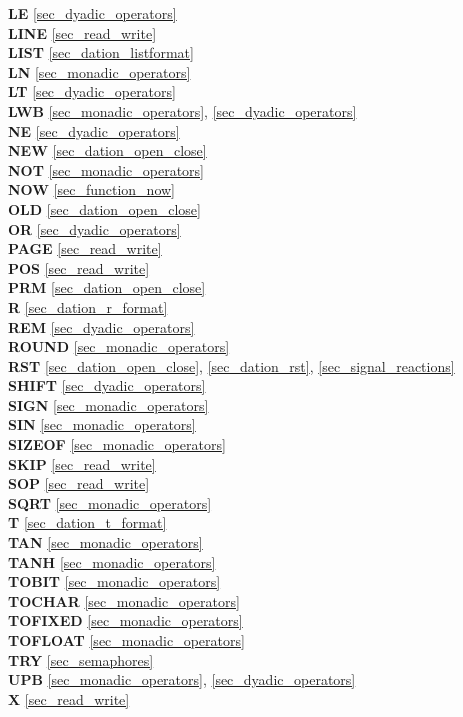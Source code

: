 { 
{\bf LE} \ref{sec_dyadic_operators}\\
{\bf LINE} \ref{sec_read_write}\\
{\bf LIST} \ref{sec_dation_listformat}\\
{\bf LN} \ref{sec_monadic_operators}\\
{\bf LT} \ref{sec_dyadic_operators}\\
{\bf LWB} \ref{sec_monadic_operators}, \ref{sec_dyadic_operators}\\
 
{\bf NE} \ref{sec_dyadic_operators}\\
{\bf NEW} \ref{sec_dation_open_close}\\
{\bf NOT} \ref{sec_monadic_operators}\\
{\bf NOW} \ref{sec_function_now}\\
 
{\bf OLD} \ref{sec_dation_open_close}\\
{\bf OR} \ref{sec_dyadic_operators}\\
 
{\bf PAGE} \ref{sec_read_write}\\
{\bf POS} \ref{sec_read_write}\\
{\bf PRM} \ref{sec_dation_open_close}\\
 
{\bf R} \ref{sec_dation_r_format}\\
{\bf REM} \ref{sec_dyadic_operators}\\
{\bf ROUND} \ref{sec_monadic_operators}\\
{\bf RST} \ref{sec_dation_open_close}, \ref{sec_dation_rst},
   \ref{sec_signal_reactions} \\
 
{\bf SHIFT} \ref{sec_dyadic_operators}\\
{\bf SIGN} \ref{sec_monadic_operators}\\
{\bf SIN} \ref{sec_monadic_operators}\\
{\bf SIZEOF} \ref{sec_monadic_operators}\\
{\bf SKIP} \ref{sec_read_write} \\
{\bf SOP}  \ref{sec_read_write}\\
{\bf SQRT} \ref{sec_monadic_operators}\\
 
{\bf T} \ref{sec_dation_t_format}\\
{\bf TAN} \ref{sec_monadic_operators}\\
{\bf TANH} \ref{sec_monadic_operators}\\
{\bf TOBIT} \ref{sec_monadic_operators}\\
{\bf TOCHAR} \ref{sec_monadic_operators}\\
{\bf TOFIXED} \ref{sec_monadic_operators}\\
{\bf TOFLOAT} \ref{sec_monadic_operators}\\
{\bf TRY} \ref{sec_semaphores}\\
 
{\bf UPB} \ref{sec_monadic_operators}, \ref{sec_dyadic_operators}\\

{\bf X} \ref{sec_read_write}
}


